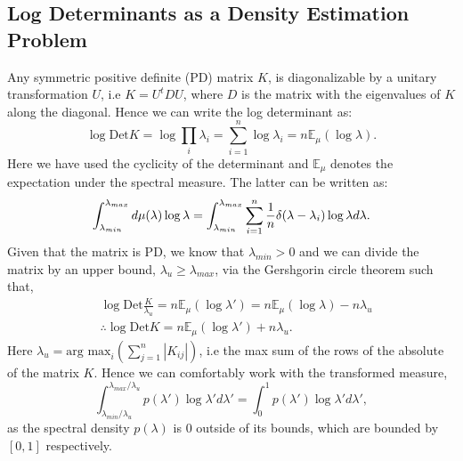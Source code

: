 \documentclass[letterpaper]{article} %
\begin{document}
\subsection{Log Determinants as a Density Estimation Problem}
Any symmetric positive definite (PD) matrix $K$, is diagonalizable by a unitary transformation $U$, i.e $K = U^{t}DU$, where $D$ is the matrix with the eigenvalues of $K$ along the diagonal. Hence we can write the log determinant as:
\begin{equation}
\log \text{Det} K = \log \prod_{i}\lambda_{i} = \sum_{i=1}^{n}\log\lambda_{i} = n\mathbb{E}_{\mu}(\log \lambda).
\end{equation} 
Here we have used the cyclicity of the determinant and $\mathbb{E}_{\mu}$ denotes the expectation under the spectral measure. The latter can be written as:
\begin{equation}
\label{eq:spectrallog}
 \int_{\lambda_{min}}^{\lambda_{max}}d\mu(\lambda)\log \lambda  \\  = \int_{\lambda_{min}}^{\lambda_{max}}\sum_{i=1}^{n}\frac{1}{n}\delta(\lambda-\lambda_{i})\log \lambda d\lambda.
\end{equation}
Given that the matrix is PD, we know that $\lambda_{min}>0$ and we can divide the matrix by an upper bound, $\lambda_{u} \geq \lambda_{max}$, via the Gershgorin circle theorem \cite{gershgorin1931uber} such that,
\begin{equation}
\begin{aligned}
& \log \text{Det} \frac{K}{\lambda_{u}} =  n\mathbb{E}_{\mu}(\log \lambda') =  n\mathbb{E}_{\mu}(\log \lambda) -  n\lambda_{u}\\
& \therefore \log \text{Det} K = n\mathbb{E}_{\mu}(\log \lambda') + n\lambda_{u}.
\end{aligned}
\end{equation}
Here $\lambda_{u} = \text{arg max}_{i}(\sum_{j=1}^{n}|K_{ij}|)$, i.e the max sum of the rows of the absolute of the matrix $K$. Hence we can comfortably work with the transformed measure,
\begin{equation}
\int_{\lambda_{min}/\lambda_{u}}^{\lambda_{max}/\lambda_{u}}p(\lambda')\log \lambda' d\lambda' = \int_{0}^{1}p(\lambda')\log \lambda' d\lambda',
\end{equation}
as the spectral density $p(\lambda)$ is $0$ outside of its bounds, which are bounded by $[0,1]$ respectively.
\end{document}
